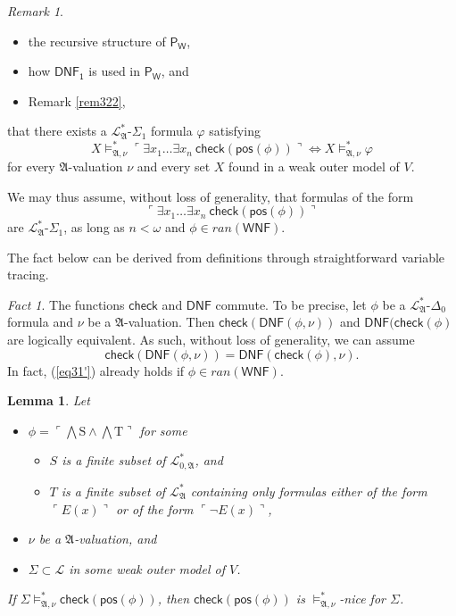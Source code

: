 \documentclass[12pt, twoside]{memoir}
\numberwithin{equation}{section}
\newtheorem{lem}[thm]{Lemma}
\theoremstyle{definition}
\theoremstyle{remark}
\newtheorem{rem}[thm]{Remark}
\newtheorem{fact}[thm]{Fact}
\theoremstyle{definition}
\theoremstyle{definition}
\theoremstyle{definition}
\theoremstyle{remark}
\begin{document}
\begin{rem}
\begin{itemize}
    \item the recursive structure of $\mathsf{P_W}$, 
    \item how $\mathsf{DNF_1}$ is used in $\mathsf{P_W}$, and
    \item Remark \ref{rem322}, 
\end{itemize}
that there exists a $\mathcal{L}^{*}_{\mathfrak{A}}$-$\Sigma_1$ formula $\varphi$ satisfying $$X \models^*_{\mathfrak{A}, \nu} \ulcorner \exists x_1 \dots \exists x_n \ \mathsf{check}(\mathsf{pos}(\phi)) \urcorner \iff X \models^*_{\mathfrak{A}, \nu} \varphi$$ for every $\mathfrak{A}$-valuation $\nu$ and every set $X$ found in a weak outer model of $V$.

We may thus assume, without loss of generality, that formulas of the form $$\ulcorner \exists x_1 \dots \exists x_n \ \mathsf{check}(\mathsf{pos}(\phi)) \urcorner$$ are $\mathcal{L}^{*}_{\mathfrak{A}}$-$\Sigma_1$, as long as $n < \omega$ and $\phi \in ran(\mathsf{WNF})$.
\end{rem}

The fact below can be derived from definitions through straightforward variable tracing.

\begin{fact}\label{fact330}
The functions $\mathsf{check}$ and $\mathsf{DNF}$ commute. To be precise, let $\phi$ be a $\mathcal{L}^{*}_{\mathfrak{A}}$-$\Delta_0$ formula and $\nu$ be a $\mathfrak{A}$-valuation. Then $\mathsf{check}(\mathsf{DNF}(\phi, \nu))$ and $\mathsf{DNF}(\mathsf{check}(\phi)$ are logically equivalent. As such, without loss of generality, we can assume
\begin{equation}\label{eq31'}
    \mathsf{check}(\mathsf{DNF}(\phi, \nu)) = \mathsf{DNF}(\mathsf{check}(\phi), \nu) \text{.}
\end{equation}
In fact, (\ref{eq31'}) already holds if $\phi \in ran(\mathsf{WNF})$.
\end{fact}

\begin{lem}\label{postrue}
Let 
\begin{itemize}
    \item $\phi = \ulcorner \bigwedge \mathrm{S} \wedge \bigwedge \mathrm{T} \urcorner$ for some 
    \begin{itemize}[label=$\circ$]
        \item $S$ is a finite subset of $\mathcal{L}^{*}_{0, \mathfrak{A}}$, and
        \item $T$ is a finite subset of $\mathcal{L}^{*}_{\mathfrak{A}}$ containing only formulas either of the form $\ulcorner E(x) \urcorner$ or of the form $\ulcorner \neg E(x) \urcorner$,
    \end{itemize}
    \item $\nu$ be a $\mathfrak{A}$-valuation, and
    \item $\Sigma \subset \mathcal{L}$ in some weak outer model of $V$.
\end{itemize}
If $\Sigma \models^*_{\mathfrak{A}, \nu} \mathsf{check}(\mathsf{pos}(\phi))$, then $\mathsf{check}(\mathsf{pos}(\phi))$ is $\models^*_{\mathfrak{A}, \nu}$-nice for $\Sigma$.
\end{lem}
\end{document}
